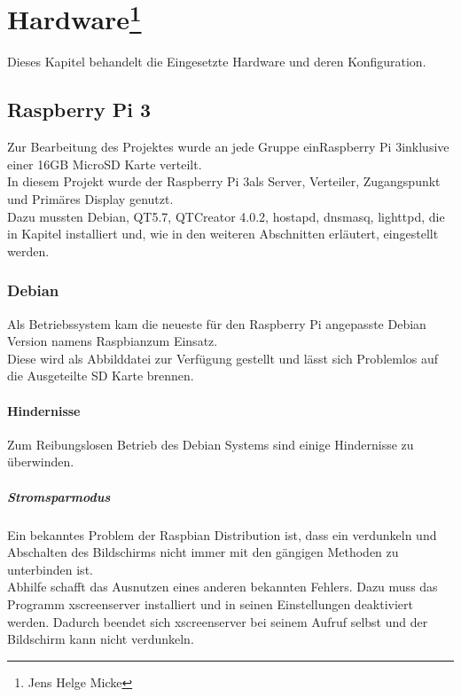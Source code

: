 \chapter[Hardware]{Hardware\footnote{Jens Helge Micke}}
\thispagestyle{fancy}
\label{Hardware}
Dieses Kapitel behandelt die Eingesetzte Hardware und deren Konfiguration.
\section{Raspberry Pi 3}
\label{HardwareRaspberryPi3}
Zur Bearbeitung des Projektes wurde an jede Gruppe ein\glqq Raspberry Pi 3\grqq inklusive einer 16GB MicroSD Karte verteilt.\\
In diesem Projekt wurde der \glqq Raspberry Pi 3\grqq als Server, Verteiler, Zugangspunkt und Primäres Display genutzt.\\
Dazu mussten Debian, QT5.7, QTCreator 4.0.2, hostapd, dnsmasq, lighttpd, die in Kapitel installiert und, wie in den weiteren Abschnitten erläutert, eingestellt werden.
\subsection{Debian}
Als Betriebssystem kam die neueste für den Raspberry Pi angepasste Debian Version namens \glqq Raspbian\grqq zum Einsatz.\\
Diese wird als Abbilddatei zur Verfügung gestellt und lässt sich Problemlos auf die Ausgeteilte SD Karte brennen.\\
\subsubsection{Hindernisse}
Zum Reibungslosen Betrieb des Debian Systems sind einige Hindernisse zu überwinden.
\paragraph{Stromsparmodus}$\;$\\
Ein bekanntes Problem der Raspbian Distribution ist, dass ein verdunkeln und Abschalten des Bildschirms nicht immer mit den gängigen Methoden zu unterbinden ist.\\
Abhilfe schafft das Ausnutzen eines anderen bekannten Fehlers. Dazu muss das Programm xscreenserver installiert und in seinen Einstellungen deaktiviert werden. Dadurch beendet sich xscreenserver bei seinem Aufruf selbst und der Bildschirm kann nicht verdunkeln.
